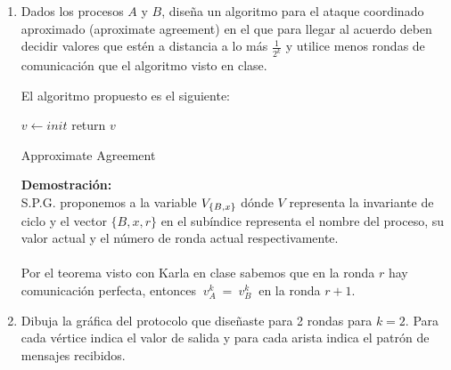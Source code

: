 \documentclass[12pt,a4paper]{report}
\begin{document}
\begin{enumerate}
	\item {
		Dados los procesos $A$ y $B$, diseña un algoritmo para el ataque coordinado
		aproximado (aproximate agreement) en el que para llegar al acuerdo deben
		decidir	valores que estén a distancia a lo más $\frac{1}{2^k}$ y utilice
		menos rondas de comunicación que el algoritmo visto en clase.

		El algoritmo propuesto es el siguiente:\\

		\IncMargin{1em}
		\begin{algorithm}
			\BlankLine
			$v \leftarrow init$ \;
			return $v$\;
			\caption{Approximate Agreement}
		\end{algorithm}\DecMargin{1em}
		
		\textbf{Demostración:}\\
		S.P.G. proponemos a la variable $V_{\{B, x\}}$ dónde $V$ representa la
		invariante de ciclo y el vector $\{B, x, r\}$ en el subíndice representa el
		nombre del proceso, su	valor actual y el número de ronda actual
		respectivamente.\\\\
		Por el teorema visto con Karla en clase sabemos que en la ronda $r$ hay
		comunicación perfecta, entonces $\ v_A^k\  =\  v_B^k\ $ en la ronda $r + 1$.
		

	}

	\item {
		Dibuja la gráfica del protocolo que diseñaste para 2 rondas para $k = 2$.
		Para cada vértice indica el valor de salida y para cada arista indica el
		patrón de mensajes recibidos.
	}


\end{enumerate}
\end{document}
